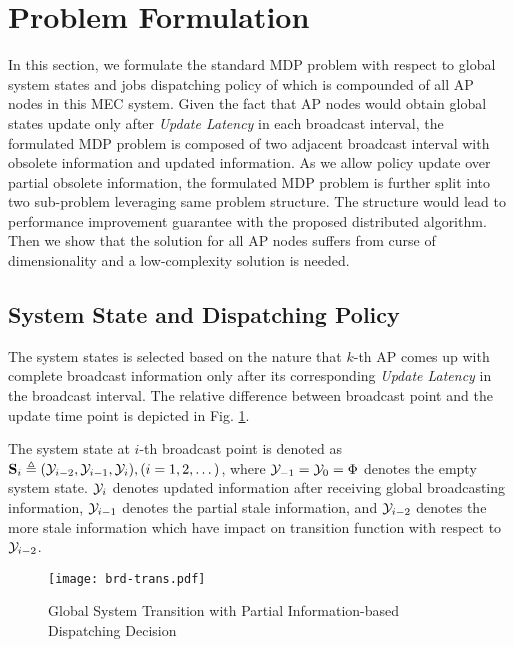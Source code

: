 \section{Problem Formulation}
In this section, we formulate the standard MDP problem with respect to global system states and jobs dispatching policy of which is compounded of all AP nodes in this MEC system.
Given the fact that AP nodes would obtain global states update only after \emph{Update Latency} in each broadcast interval, the formulated MDP problem is composed of two adjacent broadcast interval with obsolete information and updated information.
As we allow policy update over partial obsolete information, the formulated MDP problem is further split into two sub-problem leveraging same problem structure. The structure would lead to performance improvement guarantee with the proposed distributed algorithm.
Then we show that the solution for all AP nodes suffers from curse of dimensionality and a low-complexity solution is needed.

\subsection{System State and Dispatching Policy}
The system states is selected based on the nature that $k$-th AP comes up with complete broadcast information only after its corresponding \emph{Update Latency} in the broadcast interval.
The relative difference between broadcast point and the update time point is depicted in Fig. \ref{fig:brd-trans}.
\begin{definition}
    The system state at $i$-th broadcast point is denoted as $\mathbf{S}_i \triangleq (\mathcal{Y}_{i-2}, \mathcal{Y}_{i-1}, \mathcal{Y}_{i}), (i=1,2,\dots)$, where $\mathcal{Y}_{-1}=\mathcal{Y}_{0} =\Phi$ denotes the empty system state.
    $\mathcal{Y}_{i}$ denotes updated information after receiving global broadcasting information, $\mathcal{Y}_{i-1}$ denotes the partial stale information, and $\mathcal{Y}_{i-2}$ denotes the more stale information which have impact on transition function with respect to $\mathcal{Y}_{i-2}$.
\end{definition}

\begin{figure}[ht]
    \centering
    \texttt{[image: brd-trans.pdf]}
    \caption{Global System Transition with Partial Information-based Dispatching Decision}
    \label{fig:brd-trans}
\end{figure}

